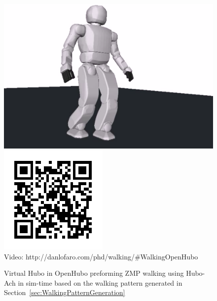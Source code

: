 \begin{figure}[thpb]
  \centering
\includegraphics[width=0.6\columnwidth]{./examples/pix/openhubo-walking.png}
\includegraphics[width=0.3\columnwidth]{./qrcode/qrcode-openhubo-walking.png}\\
      Video: http://danlofaro.com/phd/walking/\#WalkingOpenHubo
  \caption{Virtual Hubo in OpenHubo preforming ZMP walking using Hubo-Ach in sim-time based on the walking pattern generated in Section~\ref{sec:WalkingPatternGeneration}}
  \label{fig:openHuboWalkingVideo}
\end{figure}




